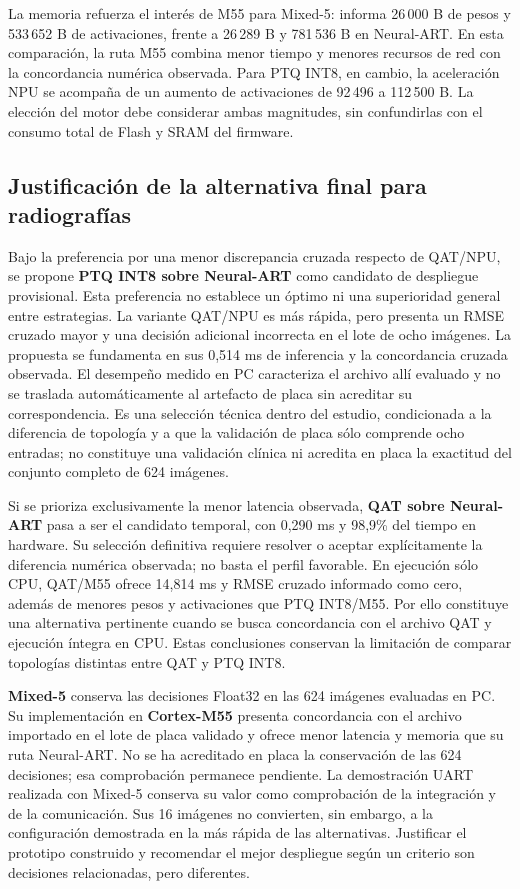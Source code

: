 La memoria refuerza el interés de M55 para Mixed-5: informa 26\,000 B de pesos y 533\,652 B de activaciones, frente a 26\,289 B y 781\,536 B en Neural-ART. En esta comparación, la ruta M55 combina menor tiempo y menores recursos de red con la concordancia numérica observada. Para PTQ INT8, en cambio, la aceleración NPU se acompaña de un aumento de activaciones de 92\,496 a 112\,500 B. La elección del motor debe considerar ambas magnitudes, sin confundirlas con el consumo total de Flash y SRAM del firmware.

\subsection{Justificación de la alternativa final para radiografías}\label{sec:decision_rx}
Bajo la preferencia por una menor discrepancia cruzada respecto de QAT/NPU, se propone \textbf{PTQ INT8 sobre Neural-ART} como candidato de despliegue provisional. Esta preferencia no establece un óptimo ni una superioridad general entre estrategias. La variante QAT/NPU es más rápida, pero presenta un RMSE cruzado mayor y una decisión adicional incorrecta en el lote de ocho imágenes. La propuesta se fundamenta en sus 0,514 ms de inferencia y la concordancia cruzada observada. El desempeño medido en PC caracteriza el archivo allí evaluado y no se traslada automáticamente al artefacto de placa sin acreditar su correspondencia. Es una selección técnica dentro del estudio, condicionada a la diferencia de topología y a que la validación de placa sólo comprende ocho entradas; no constituye una validación clínica ni acredita en placa la exactitud del conjunto completo de 624 imágenes.

Si se prioriza exclusivamente la menor latencia observada, \textbf{QAT sobre Neural-ART} pasa a ser el candidato temporal, con 0,290 ms y 98,9\% del tiempo en hardware. Su selección definitiva requiere resolver o aceptar explícitamente la diferencia numérica observada; no basta el perfil favorable. En ejecución sólo CPU, QAT/M55 ofrece 14,814 ms y RMSE cruzado informado como cero, además de menores pesos y activaciones que PTQ INT8/M55. Por ello constituye una alternativa pertinente cuando se busca concordancia con el archivo QAT y ejecución íntegra en CPU. Estas conclusiones conservan la limitación de comparar topologías distintas entre QAT y PTQ INT8.

\textbf{Mixed-5} conserva las decisiones Float32 en las 624 imágenes evaluadas en PC. Su implementación en \textbf{Cortex-M55} presenta concordancia con el archivo importado en el lote de placa validado y ofrece menor latencia y memoria que su ruta Neural-ART. No se ha acreditado en placa la conservación de las 624 decisiones; esa comprobación permanece pendiente. La demostración UART realizada con Mixed-5 conserva su valor como comprobación de la integración y de la comunicación. Sus 16 imágenes no convierten, sin embargo, a la configuración demostrada en la más rápida de las alternativas. Justificar el prototipo construido y recomendar el mejor despliegue según un criterio son decisiones relacionadas, pero diferentes.

